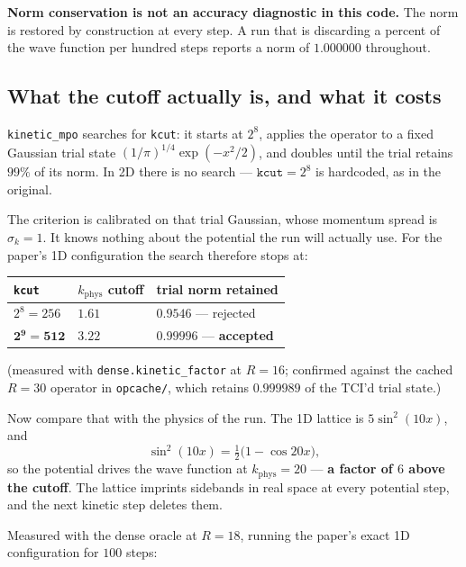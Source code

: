 \documentclass[11pt,a4paper]{article}
\newcommand{\code}[1]{\texttt{#1}}
\newcommand{\kph}{k_{\mathrm{phys}}}
\begin{document}
\begin{finding}
\textbf{Norm conservation is not an accuracy diagnostic in this code.} The norm is
restored by construction at every step. A run that is discarding a percent of the
wave function per hundred steps reports a norm of $1.000000$ throughout.
\end{finding}

\subsection{What the cutoff actually is, and what it costs}

\code{kinetic\_mpo} searches for \code{kcut}: it starts at $2^8$, applies the
operator to a fixed Gaussian trial state $(1/\pi)^{1/4}\exp(-x^2/2)$, and doubles
until the trial retains $99\%$ of its norm. In 2D there is no search ---
$\code{kcut} = 2^8$ is hardcoded, as in the original.

The criterion is calibrated on that trial Gaussian, whose momentum spread is
$\sigma_k = 1$. It knows nothing about the potential the run will actually use. For
the paper's 1D configuration the search therefore stops at:

\begin{center}
\begin{tabular}{@{}lll@{}}
\toprule
\code{kcut} & $\kph$ cutoff & trial norm retained \\
\midrule
$2^8 = 256$          & $1.61$          & $0.9546$ --- rejected \\
$\mathbf{2^9 = 512}$ & $\mathbf{3.22}$ & $\mathbf{0.99996}$ --- \textbf{accepted} \\
\bottomrule
\end{tabular}
\end{center}

\noindent
(measured with \code{dense.kinetic\_factor} at $R = 16$; confirmed against the cached
$R = 30$ operator in \code{opcache/}, which retains $0.999989$ of the TCI'd trial
state.)

Now compare that with the physics of the run. The 1D lattice is $5\sin^2(10x)$, and
\begin{equation}
  \sin^2(10x) = \tfrac{1}{2}\big(1 - \cos 20x\big),
\end{equation}
so the potential drives the wave function at $\kph = 20$ --- \textbf{a factor of $6$
above the cutoff}. The lattice imprints sidebands in real space at every potential
step, and the next kinetic step deletes them.

Measured with the dense oracle at $R = 18$, running the paper's exact 1D
configuration for $100$ steps:
\end{document}
